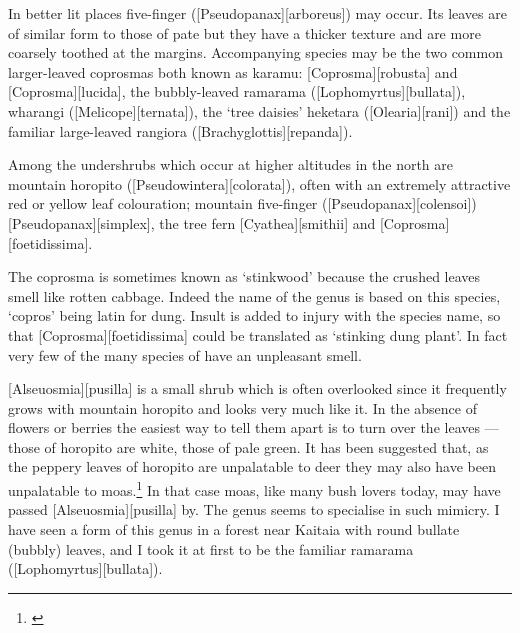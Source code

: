 In better lit places five-finger ([Pseudopanax][arboreus]) may occur.
Its leaves are of similar form to those of pate but they have a thicker texture and are more coarsely toothed at the margins.
Accompanying species may be the two common larger-leaved coprosmas both known as karamu: [Coprosma][robusta] and [Coprosma][lucida], the bubbly-leaved ramarama ([Lophomyrtus][bullata]), wharangi ([Melicope][ternata]), the `tree daisies' heketara ([Olearia][rani]) and the familiar large-leaved rangiora ([Brachyglottis][repanda]).

Among the undershrubs which occur at higher altitudes in the north are mountain horopito ([Pseudowintera][colorata]), often with an extremely attractive red or yellow leaf colouration; mountain five-finger ([Pseudopanax][colensoi]) [Pseudopanax][simplex], the tree fern [Cyathea][smithii] and [Coprosma][foetidissima].

The coprosma is sometimes known as `stinkwood' because the crushed leaves smell like rotten cabbage.
Indeed the name of the genus is based on this species, `copros' being latin for dung.
Insult is added to injury with the species name, so that [Coprosma][foetidissima] could be translated as `stinking dung plant'.
In fact very few of the many species of  have an unpleasant smell.

[Alseuosmia][pusilla] is a small shrub which is often overlooked since it frequently grows with mountain horopito and looks very much like it.
In the absence of flowers or berries the easiest way to tell them apart is to turn over the leaves --- those of horopito are white, those of  pale green.
It has been suggested that, as the peppery leaves of horopito are unpalatable to deer they may also have been unpalatable to moas.\footnote{\cite{greenwood1977evolution}}
In that case moas, like many bush lovers today, may have passed [Alseuosmia][pusilla] by.
The genus  seems to specialise in such mimicry.
I have seen a form of this genus in a forest near Kaitaia with round bullate (bubbly) leaves, and I took it at first to be the familiar ramarama ([Lophomyrtus][bullata]).

